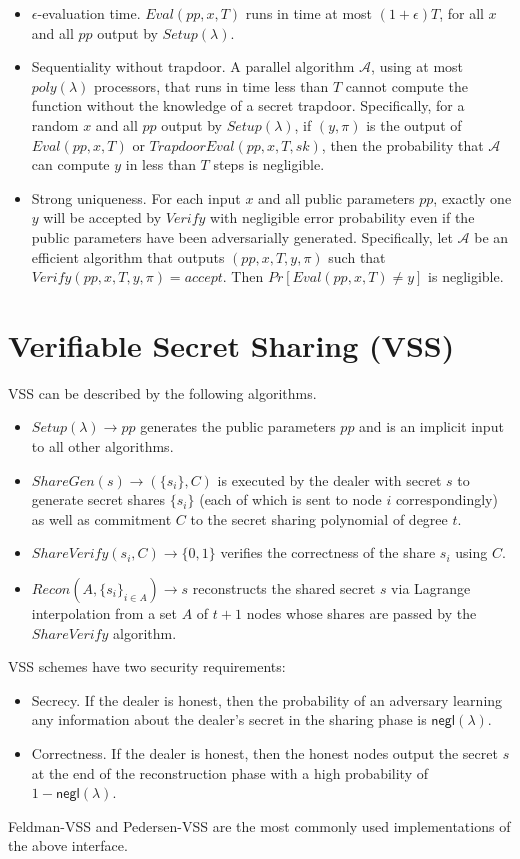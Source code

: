 \documentclass[letterpaper,twocolumn,10pt]{article}
\theoremstyle{definition}
\theoremstyle{remark}
\begin{document}
\begin{itemize}
    \item $\epsilon$-evaluation time. $Eval(pp, x, T)$ runs in time at most $(1 + \epsilon) T$, for all $x$ and all $pp$ output by $Setup(\lambda)$.
    \item Sequentiality without trapdoor. A parallel algorithm $\mathcal{A}$, using at most $poly(\lambda)$ processors, that runs in time less than $T$ cannot compute the function without the knowledge of a secret trapdoor. Specifically, for a random $x$ and all $pp$ output by $Setup(\lambda)$, if $(y, \pi)$ is the output of $Eval(pp, x, T)$ or $TrapdoorEval(pp,x,T,sk)$, then the probability that $\mathcal{A}$ can compute $y$ in less than $T$ steps is negligible.
    \item Strong uniqueness. For each input $x$ and all public parameters $pp$, exactly one $y$ will be accepted by $Verify$ with negligible error probability even if the public parameters have been adversarially generated. Specifically, let $\mathcal{A}$ be an efficient algorithm that outputs $(pp, x, T, y, \pi)$ such that $Verify(pp, x, T, y, \pi) = accept$. Then $Pr[Eval(pp, x, T) \neq y]$ is negligible.
\end{itemize}

\section{Verifiable Secret Sharing (VSS)}
\label{appendix:vss}
VSS can be described by the following algorithms.
\begin{itemize}
    \item $Setup(\lambda) \rightarrow pp$ generates the public parameters $pp$ and is an implicit input to all other algorithms.
    \item $ShareGen(s) \rightarrow (\{s_i\}, C)$ is executed by the dealer with secret $s$ to generate secret shares $\{s_i\}$ (each of which is sent to node $i$ correspondingly) as well as commitment $C$ to the secret sharing polynomial of degree $t$.
    \item $ShareVerify(s_i, C) \rightarrow \{0, 1\}$ verifies the correctness of the share $s_i$ using $C$.
    \item $Recon(A, \{s_i\}_{i \in A}) \rightarrow s$ reconstructs the shared secret $s$ via Lagrange interpolation from a set $A$ of $t + 1$ nodes whose shares are passed by the $ShareVerify$ algorithm.
\end{itemize}

VSS schemes have two security requirements:
\begin{itemize}
    \item Secrecy. If the dealer is honest, then the probability of an adversary learning
    any information about the dealer’s secret in the sharing phase is $\mathsf{negl}(\lambda)$.
    \item Correctness. If the dealer is honest, then the honest nodes output the secret
    $s$ at the end of the reconstruction phase with a high probability of $1 - \mathsf{negl}(\lambda)$.
\end{itemize}
Feldman-VSS \cite{feldman1987practical} and Pedersen-VSS \cite{pedersen1991non} are the most commonly used implementations of the above interface.
\end{document}
